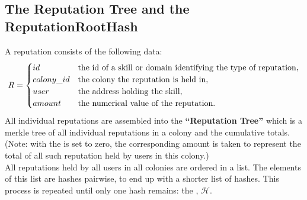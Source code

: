 \subsection{The Reputation Tree and the ReputationRootHash}
A reputation consists of the following data:
$$
R = 
\begin{cases}
 id & \textnormal{the id of a skill or domain identifying the type of reputation},\\
 colony\_id & \textnormal{the colony the reputation is held in},\\
 user & \textnormal{the address holding the skill},\\
 amount & \textnormal{the numerical value of the reputation}.
\end{cases}
$$
All individual reputations are assembled into the \textbf{``Reputation Tree''} which is a merkle tree of all individual reputations in a colony and the cumulative totals. (Note: with the  is set to zero, the corresponding amount is taken to represent the total of all such reputation held by users in this colony.)\\
All reputations held by all users in all colonies are ordered in a list. The elements of this list are hashes pairwise, to end up with a shorter list of hashes. This process is repeated until only one hash remains: the , $\mathcal{H}$.
\begin{center}
\end{center}

